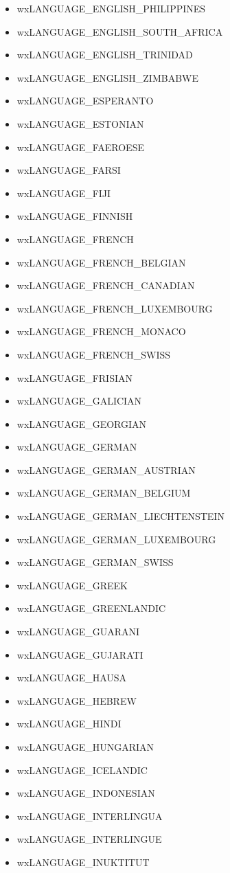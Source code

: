 \begin{itemize}
\item wxLANGUAGE\_ENGLISH\_PHILIPPINES
\item wxLANGUAGE\_ENGLISH\_SOUTH\_AFRICA
\item wxLANGUAGE\_ENGLISH\_TRINIDAD
\item wxLANGUAGE\_ENGLISH\_ZIMBABWE
\item wxLANGUAGE\_ESPERANTO
\item wxLANGUAGE\_ESTONIAN
\item wxLANGUAGE\_FAEROESE
\item wxLANGUAGE\_FARSI
\item wxLANGUAGE\_FIJI
\item wxLANGUAGE\_FINNISH
\item wxLANGUAGE\_FRENCH
\item wxLANGUAGE\_FRENCH\_BELGIAN
\item wxLANGUAGE\_FRENCH\_CANADIAN
\item wxLANGUAGE\_FRENCH\_LUXEMBOURG
\item wxLANGUAGE\_FRENCH\_MONACO
\item wxLANGUAGE\_FRENCH\_SWISS
\item wxLANGUAGE\_FRISIAN
\item wxLANGUAGE\_GALICIAN
\item wxLANGUAGE\_GEORGIAN
\item wxLANGUAGE\_GERMAN
\item wxLANGUAGE\_GERMAN\_AUSTRIAN
\item wxLANGUAGE\_GERMAN\_BELGIUM
\item wxLANGUAGE\_GERMAN\_LIECHTENSTEIN
\item wxLANGUAGE\_GERMAN\_LUXEMBOURG
\item wxLANGUAGE\_GERMAN\_SWISS
\item wxLANGUAGE\_GREEK
\item wxLANGUAGE\_GREENLANDIC
\item wxLANGUAGE\_GUARANI
\item wxLANGUAGE\_GUJARATI
\item wxLANGUAGE\_HAUSA
\item wxLANGUAGE\_HEBREW
\item wxLANGUAGE\_HINDI
\item wxLANGUAGE\_HUNGARIAN
\item wxLANGUAGE\_ICELANDIC
\item wxLANGUAGE\_INDONESIAN
\item wxLANGUAGE\_INTERLINGUA
\item wxLANGUAGE\_INTERLINGUE
\item wxLANGUAGE\_INUKTITUT

\end{itemize}
